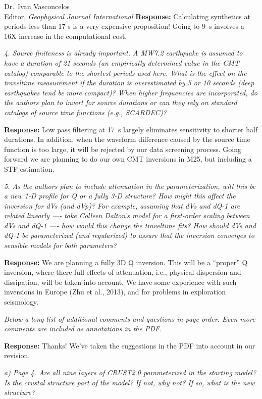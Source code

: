 \documentclass[11pt,a4paper]{letter}
\newcommand{\response}[1]{\textbf{Response:} #1}
\newcommand{\rev}[1]{{\it{#1}}}
\begin{document}
\begin{letter}{Dr.~Ivan Vasconcelos\\
Editor, \textit{Geophysical Journal International}}
\response{Calculating synthetics at periods less than 17 s is a very expensive proposition! Going to 9~s involves a 16X increase in the computational cost.
}

\rev{4. Source finiteness is already important. A MW7.2 earthquake is assumed to have a duration of 21 seconds (an empirically determined value in the CMT catalog) comparable to the shortest periods used here. What is the effect on the traveltime measurement if the duration is overestimated by 5 or 10 seconds (deep earthquakes tend be more compact)? When higher frequencies are incorporated, do the authors plan to invert for source durations or can they rely on standard catalogs of source time functions (e.g., SCARDEC)?
}

\response{Low pass filtering at 17~s largely eliminates sensitivity to shorter half durations. 
In addition, when the waveform difference caused by the source time function is too large, it will be rejected by our data screening process. Going forward we are planning to do our own CMT inversions in M25, but including a STF estimation.
}

\rev{5. As the authors plan to include attenuation in the parameterization, will this be a new 1-D profile for Q or a fully 3-D structure? How might this affect the inversion for dVs (and dVp)? For example, assuming that dVs and dQ-1 are related linearly ---- take Colleen Dalton's model for a first-order scaling between dVs and dQ-1 ---- how would this change the traveltime fits? How should dVs and dQ-1 be parameterized (and regularized) to assure that the inversion converges to sensible models for both parameters?
}

\response{We are planning a fully 3D Q inversion. This will be a ``proper'' Q inversion,
where there full effects of attenuation, i.e., physical dispersion and dissipation, will be taken into account. We have some experience with such inversions in Europe (Zhu et al., 2013), and for problems in exploration seismology.
}

\rev{Below a long list of additional comments and questions in page order. Even more comments are included as annotations in the PDF.}

\response{Thanks! We've taken the suggestions in the PDF into account in our revision.}

\rev{a) Page 4. Are all nine layers of CRUST2.0 parameterized in the starting model? Is the crustal structure part of the model? If not, why not? If so, what is the new structure?
}


\end{letter}
\end{document}
